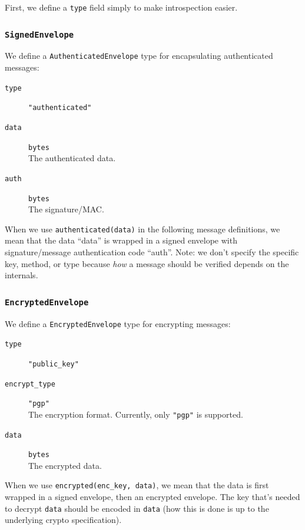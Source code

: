 \documentclass[pdftex,12pt,a4papaer,twoside,notitlepage]{report}
\begin{document}
First, we define a \texttt{type} field simply to make introspection easier.

\subsubsection{\texttt{SignedEnvelope}}

We define a \texttt{AuthenticatedEnvelope} type for encapsulating authenticated messages:

\begin{leftbar}
\begin{description}
\item[\texttt{type}] \verb="authenticated"=
\item[\texttt{data}] \texttt{bytes} \\
  The authenticated data.
\item[\texttt{auth}] \texttt{bytes} \\
  The signature/MAC.
\end{description}
\end{leftbar}

When we use \verb=authenticated(data)= in the following message definitions, we
mean that the data ``data'' is wrapped in a signed envelope with
signature/message authentication code ``auth''. Note: we don't specify the
specific key, method, or type because \emph{how} a message should be verified
depends on the internals.

\subsubsection{\texttt{EncryptedEnvelope}}

We define a \texttt{EncryptedEnvelope} type for encrypting messages:
\begin{leftbar}
\begin{description}
\item[\texttt{type}] \verb="public_key"=
\item[\texttt{encrypt\_type}] \verb="pgp"= \\
  The encryption format. Currently, only \verb="pgp"= is supported.
\item[\texttt{data}] \texttt{bytes} \\
  The encrypted data.
\end{description}
\end{leftbar}

When we use \verb=encrypted(enc_key, data)=, we mean that the data is first
wrapped in a signed envelope, then an encrypted envelope. The key that's needed
to decrypt \texttt{data} should be encoded in \texttt{data} (how this is done is
up to the underlying crypto specification).
\end{document}
